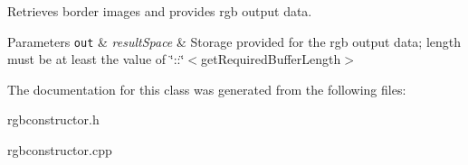 Retrieves border images and provides rgb output data. 


\begin{DoxyParams}[1]{Parameters}
\mbox{\tt out}  & {\em result\+Space} & Storage provided for the rgb output data; length must be at least the value of \char`\"{}\+::\char`\"{}$<$get\+Required\+Buffer\+Length$>$ \\
\hline
\end{DoxyParams}


The documentation for this class was generated from the following files\+:\begin{DoxyCompactItemize}
\item 
rgbconstructor.\+h\item 
rgbconstructor.\+cpp\end{DoxyCompactItemize}
